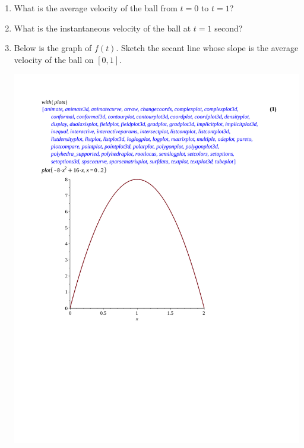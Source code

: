 \documentclass[12pt]{article}
\newif\ifans
\begin{document}
\begin{enumerate}
\begin{enumerate}
\ifans{\fbox{After $2$ seconds}} \fi

\item What is the average velocity of the ball from $t=0$ to $t=1$? 

\ifans{\fbox{8 ft/sec}} \fi

\item What is the instantaneous velocity of the ball at $t=1$ second?

\ifans{\fbox{0 ft/sec}} \fi 

\item Below is the graph of $f(t)$.  Sketch the secant line whose slope is the average velocity of the ball on $[0,1]$.\\

\begin{center}
\includegraphics[scale=0.5]{graph2.pdf}
\end{center} 


\end{enumerate}
\end{enumerate}
\end{document}
